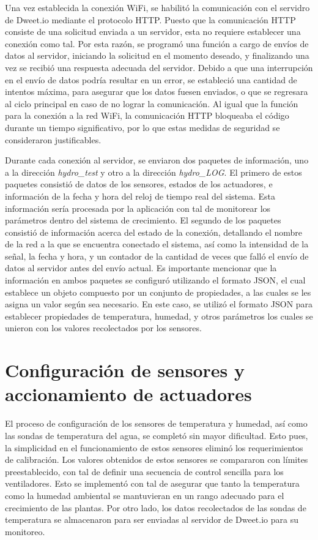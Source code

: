 Una vez establecida la conexión WiFi, se habilitó la comunicación con el servidro de Dweet.io mediante el protocolo HTTP. Puesto que la comunicación HTTP consiste de una solicitud enviada a un servidor, esta no requiere establecer una conexión como tal. Por esta razón, se programó una función a cargo de envíos de datos al servidor, iniciando la solicitud en el momento deseado, y finalizando una vez se recibió una respuesta adecuada del servidor. Debido a que una interrupción en el envío de datos podría resultar en un error, se estableció una cantidad de intentos máxima, para asegurar que los datos fuesen enviados, o que se regresara al ciclo principal en caso de no lograr la comunicación. Al igual que la función para la conexión a la red WiFi, la comunicación HTTP bloqueaba el código durante un tiempo significativo, por lo que estas medidas de seguridad se consideraron justificables.

Durante cada conexión al servidor, se enviaron dos paquetes de información, uno a la dirección \textit{hydro\_test} y otro a la dirección \textit{hydro\_LOG}. El primero de estos paquetes consistió de datos de los sensores, estados de los actuadores, e información de la fecha y hora del reloj de tiempo real del sistema. Esta información sería procesada por la aplicación con tal de monitorear los parámetros dentro del sistema de crecimiento. El segundo de los paquetes consistió de información acerca del estado de la conexión, detallando el nombre de la red a la que se encuentra conectado el sistema, así como la intensidad de la señal, la fecha y hora, y un contador de la cantidad de veces que falló el envío de datos al servidor antes del envío actual. Es importante mencionar que la información en ambos paquetes se configuró utilizando el formato JSON, el cual establece un objeto compuesto por un conjunto de propiedades, a las cuales se les asigna un valor según sea necesario. En este caso, se utilizó el formato JSON para establecer propiedades de temperatura, humedad, y otros parámetros los cuales se unieron con los valores recolectados por los sensores.

\section{Configuración de sensores y accionamiento de actuadores}

El proceso de configuración de los sensores de temperatura y humedad, así como las sondas de temperatura del agua, se completó sin mayor dificultad. Esto pues, la simplicidad en el funcionamiento de estos sensores eliminó los requerimientos de calibración. Los valores obtenidos de estos sensores se compararon con límites preestablecido, con tal de definir una secuencia de control sencilla para los ventiladores. Esto se implementó con tal de asegurar que tanto la temperatura como la humedad ambiental se mantuvieran en un rango adecuado para el crecimiento de las plantas. Por otro lado, los datos recolectados de las sondas de temperatura se almacenaron para ser enviadas al servidor de Dweet.io para su monitoreo.


